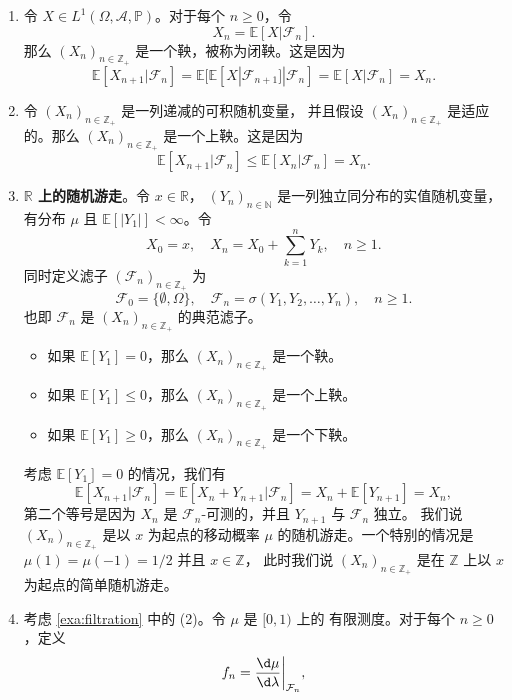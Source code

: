 \documentclass[fontset=none]{Notes}
\begin{document}
\begin{example}
  \mbox{}
  \begin{enumerate}
    \item 令 $X\in L^1(\Omega,\mathcal{A},\mathbb{P})$。对于每个 $n\geq 0$，令
    \[
      X_n=\mathbb{E}[X| \mathcal{F}_n].
    \]
    那么 $(X_n)_{n\in \mathbb{Z}_+}$ 是一个鞅，被称为闭鞅。这是因为 
    \[
      \mathbb{E}[X_{n+1}| \mathcal{F}_n]=
      \mathbb{E}[\mathbb{E}[X|\mathcal{F}_{n+1}]| \mathcal{F}_n]=
      \mathbb{E}[X| \mathcal{F}_n]=X_n.
    \]
    \item 令 $(X_n)_{n\in \mathbb{Z}_+}$ 是一列递减的可积随机变量，
    并且假设 $(X_n)_{n\in \mathbb{Z}_+}$ 是适应的。那么 
    $(X_n)_{n\in \mathbb{Z}_+}$ 是一个上鞅。这是因为
    \[
      \mathbb{E}[X_{n+1}|\mathcal{F}_n]\leq \mathbb{E}[X_n|\mathcal{F}_n]=X_n.
    \]
    \item \textbf{$\mathbb{R}$ 上的随机游走}。令 $x\in \mathbb{R}$，
    $(Y_n)_{n\in \mathbb{N}}$ 是一列独立同分布的实值随机变量，有分布 $\mu$
    且 $\mathbb{E}[|Y_1|]<\infty$。令
    \[
      X_0=x,\quad X_n=X_0+\sum_{k=1}^n Y_k,\quad n\geq 1.
    \]
    同时定义滤子 $(\mathcal{F}_n)_{n\in \mathbb{Z}_+}$ 为 
    \[
      \mathcal{F}_0=\{\emptyset,\Omega\},\quad 
      \mathcal{F}_n=\sigma(Y_1,Y_2,\dots,Y_n),\quad n\geq 1.
    \]
    也即 $\mathcal{F}_n$ 是 $(X_n)_{n\in \mathbb{Z}_+}$ 的典范滤子。
    \begin{itemize}
      \item 如果 $\mathbb{E}[Y_1]=0$，那么 $(X_n)_{n\in \mathbb{Z}_+}$ 是一个鞅。
      \item 如果 $\mathbb{E}[Y_1]\leq 0$，那么 $(X_n)_{n\in \mathbb{Z}_+}$ 是一个上鞅。
      \item 如果 $\mathbb{E}[Y_1]\geq 0$，那么 $(X_n)_{n\in \mathbb{Z}_+}$ 是一个下鞅。
    \end{itemize}
    考虑 $\mathbb{E}[Y_1]=0$ 的情况，我们有
    \[
      \mathbb{E}[X_{n+1}|\mathcal{F}_n]=
      \mathbb{E}[X_n+Y_{n+1}| \mathcal{F}_n]=
      X_n+\mathbb{E}[Y_{n+1}]=X_n,
    \]
    第二个等号是因为 $X_n$ 是 $\mathcal{F}_n$-可测的，并且 $Y_{n+1}$
    与 $\mathcal{F}_n$ 独立。
    我们说 $(X_n)_{n\in \mathbb{Z}_+}$ 是以 $x$ 为起点的移动概率 $\mu$
    的随机游走。一个特别的情况是 $\mu(1)=\mu(-1)=1/2$ 并且 $x\in \mathbb{Z}$，
    此时我们说 $(X_n)_{n\in \mathbb{Z}_+}$ 是在 $\mathbb{Z}$ 上以 $x$ 为起点的简单随机游走。
    \item 考虑 \autoref{exa:filtration} 中的 (2)。令 $\mu$ 是 $[0,1)$ 上的
    有限测度。对于每个 $n\geq 0$，定义
    \[
      f_n=\frac{\d \mu}{\d \lambda}\bigg|_{\mathcal{F}_n},
\]
\end{enumerate}
\end{example}
\end{document}
